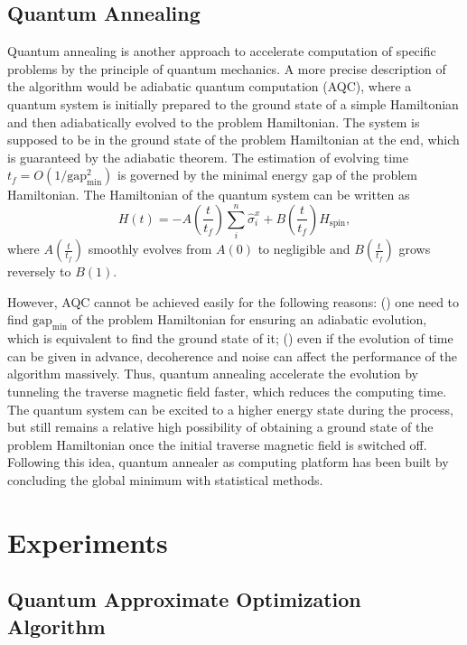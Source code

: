 \documentclass[aps,pra,twocolumn,superscriptaddress]{revtex4-2}
\begin{document}
\subsection{Quantum Annealing}
Quantum annealing is another approach to accelerate computation of specific problems by the principle of quantum mechanics. A more precise description of the algorithm would be adiabatic quantum computation (AQC), where a quantum system is initially prepared to the ground state of a simple Hamiltonian and then adiabatically evolved to the problem Hamiltonian. The system is supposed to be in the ground state of the problem Hamiltonian at the end, which is guaranteed by the adiabatic theorem. The estimation of evolving time $t_f=O(1/\text{gap}^2_{\min})$ is governed by the minimal energy gap of the problem Hamiltonian. The Hamiltonian of the quantum system can be written as
\begin{equation}
\label{eq:H_2D}
H(t)=-A(\frac{t}{t_f})\sum_i^n\hat{\sigma}_i^x+B(\frac{t}{t_f})H_{\text{spin}},
\end{equation}
where $A(\frac{t}{t_f})$ smoothly evolves from $A(0)$ to negligible and $B(\frac{t}{t_f})$ grows reversely to $B(1)$. 

However, AQC cannot be achieved easily for the following reasons: () one need to find $\text{gap}_{\min}$ of the problem Hamiltonian for ensuring an adiabatic evolution, which is equivalent to find the ground state of it; () even if the evolution of time can be given in advance, decoherence and noise can affect the performance of the algorithm massively. Thus, quantum annealing accelerate the evolution by tunneling the traverse magnetic field faster, which reduces the computing time. The quantum system can be excited to a higher energy state during the process, but still remains a relative high possibility of obtaining a ground state of the problem Hamiltonian once the initial traverse magnetic field is switched off. Following this idea, quantum annealer as computing platform has been built by concluding the global minimum with statistical methods.


\section{Experiments\label{sec:exp}}
\subsection{Quantum Approximate Optimization Algorithm} 
\end{document}
